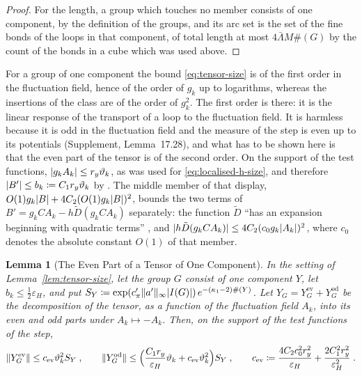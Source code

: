 \documentclass[11pt]{preprint}
\DeclarePairedDelimiter{\abs}{\lvert}{\rvert}
\DeclarePairedDelimiter{\norm}{\lVert}{\rVert}
\numberwithin{equation}{section}
\newtheorem{lemma}[theorem]{Lemma}
\theoremstyle{definition}
\theoremstyle{remark}
\theoremstyle{plain}
\begin{document}
\begin{proof}
For the length, a group which touches no member consists of one component, by the definition of the groups, and its arc set is the set of the fine bonds of the loops in that component, of total length at most $4\bar\Lambda M\#(G)$ by the count of the bonds in a cube which was used above.
\end{proof}

For a group of one component the bound \eqref{eq:tensor-size} is of the first order in the fluctuation field, hence of the order of $g_k$ up to logarithms, whereas the insertions of the class are of the order of $g_k^2$. The first order is there: it is the linear response of the transport of a loop to the fluctuation field. It is harmless because it is odd in the fluctuation field and the measure of the step is even up to its potentials (Supplement, Lemma~17.28), and what has to be shown here is that the even part of the tensor is of the second order. On the support of the test functions, $\abs{g_kA_k} \leq r_y\vartheta_k$, as was used for \eqref{eq:localised-h-size}, and therefore $\abs{B'} \leq b_k \coloneqq C_1r_y\vartheta_k$ by \cite[(1.20), p.~6]{BalabanRG2}. The middle member of that display, $O(1)g_k\abs B + 4C_2(O(1)g_k\abs B)^2$, bounds the two terms of $B' = g_kCA_k - h\tilde D(g_kCA_k)$ separately: the function $\tilde D$ ``has an expansion beginning with quadratic terms'' \cite[p.~267]{BalabanRG1}, and $\abs{h\tilde D(g_kCA_k)} \leq 4C_2(c_0g_k\abs{A_k})^2$, where $c_0$ denotes the absolute constant $O(1)$ of that member.

\begin{lemma}[The Even Part of a Tensor of One Component]\label{lem:tensor-parity}
In the setting of Lemma~\ref{lem:tensor-size}, let the group $G$ consist of one component $Y$, let $b_k \leq \frac12\varepsilon_H$, and put $S_Y \coloneqq \exp(c'_\pi\norm{a'}_\infty\abs{I(G)})\,e^{-(\kappa_1 - 2)\#(Y)}$. Let $Y_G = Y^{\mathrm{ev}}_G + Y^{\mathrm{od}}_G$ be the decomposition of the tensor, as a function of the fluctuation field $A_k$, into its even and odd parts under $A_k \mapsto -A_k$. Then, on the support of the test functions of the step,
\begin{equation}\label{eq:tensor-parity}
    \norm{Y^{\mathrm{ev}}_G} \leq c_{\mathrm{ev}}\vartheta_k^2S_Y\;,
    \qquad
    \norm{Y^{\mathrm{od}}_G} \leq \Bigl(\frac{C_1r_y}{\varepsilon_H}\vartheta_k + c_{\mathrm{ev}}\vartheta_k^2\Bigr)S_Y\;,
    \qquad
    c_{\mathrm{ev}} \coloneqq \frac{4C_2c_0^2r_y^2}{\varepsilon_H} + \frac{2C_1^2r_y^2}{\varepsilon_H^2}\;.
\end{equation}
\end{lemma}
\end{document}
